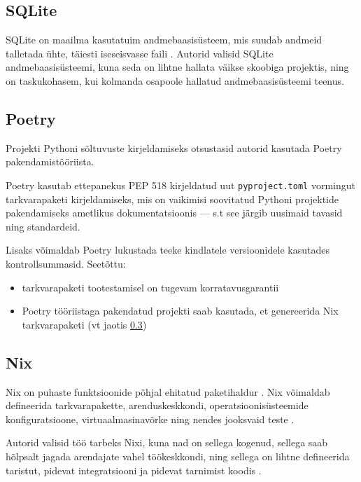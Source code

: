 \subsection{SQLite}

SQLite on maailma kasutatuim andmebaasisüsteem\cite{sqlite}, mis suudab andmeid talletada ühte, täiesti iseseisvasse faili \cite{sqlite-db-file}. Autorid valisid SQLite andmebaasisüsteemi, kuna seda on lihtne hallata väikse skoobiga projektis, ning on taskukohasem, kui kolmanda osapoole hallatud andmebaasisüsteemi teenus.

\subsection{Poetry}

Projekti Pythoni sõltuvuste kirjeldamiseks otsustasid autorid kasutada Poetry pakendamistööriista.

Poetry kasutab ettepanekus PEP 518 \cite{pep518} kirjeldatud uut \texttt{pyproject.toml} vormingut tarkvarapaketi kirjeldamiseks, mis on vaikimisi soovitatud Pythoni projektide pakendamiseks ametlikus dokumentatsioonis \cite{python-packaging} — s.t see järgib uusimaid tavasid ning standardeid.

Lisaks võimaldab Poetry lukustada teeke kindlatele versioonidele kasutades kontrollsummasid. Seetõttu:

\begin{itemize}
  \item tarkvarapaketi tootestamisel on tugevam korratavusgarantii
  \item Poetry tööriistaga pakendatud projekti saab kasutada, et genereerida Nix tarkvarapaketi (vt jaotis \ref{subsec:nix})
\end{itemize}

\subsection{Nix}\label{subsec:nix}

Nix on puhaste funktsioonide põhjal ehitatud paketihaldur \cite{nixos-how-nix-works}. Nix võimaldab defineerida tarkvarapakette, arenduskeskkondi, operatsioonisüsteemide konfiguratsioone, virtuaalmasinavõrke ning nendes jooksvaid teste \cite{nixos-explore, nixos-manual-vmtests}.

Autorid valisid töö tarbeks Nixi, kuna nad on sellega kogenud, sellega saab hõlpsalt jagada arendajate vahel töökeskkondi, ning sellega on lihtne defineerida taristut, pidevat integratsiooni ja pidevat tarnimist koodis \cite{nixos-explore}.

